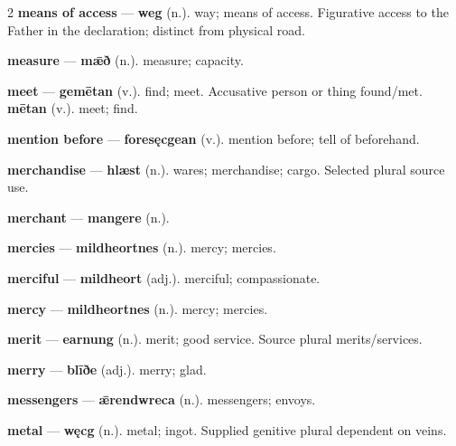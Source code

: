 \begin{multicols}{2}
\textbf{means of access} — \textbf{weg} (n.). way; means of access. Figurative access to the Father in the declaration; distinct from physical road.\par
\textbf{measure} — \textbf{mǣð} (n.). measure; capacity.\par
\textbf{meet} — \textbf{gemētan} (v.). find; meet. Accusative person or thing found/met. \textbf{mētan} (v.). meet; find.\par
\textbf{mention before} — \textbf{foresęcgean} (v.). mention before; tell of beforehand.\par
\textbf{merchandise} — \textbf{hlæst} (n.). wares; merchandise; cargo. Selected plural source use.\par
\textbf{merchant} — \textbf{mangere} (n.).\par
\textbf{mercies} — \textbf{mildheortnes} (n.). mercy; mercies.\par
\textbf{merciful} — \textbf{mildheort} (adj.). merciful; compassionate.\par
\textbf{mercy} — \textbf{mildheortnes} (n.). mercy; mercies.\par
\textbf{merit} — \textbf{earnung} (n.). merit; good service. Source plural merits/services.\par
\textbf{merry} — \textbf{blīðe} (adj.). merry; glad.\par
\textbf{messengers} — \textbf{ǣrendwreca} (n.). messengers; envoys.\par
\textbf{metal} — \textbf{węcg} (n.). metal; ingot. Supplied genitive plural dependent on veins.\par

\end{multicols}
